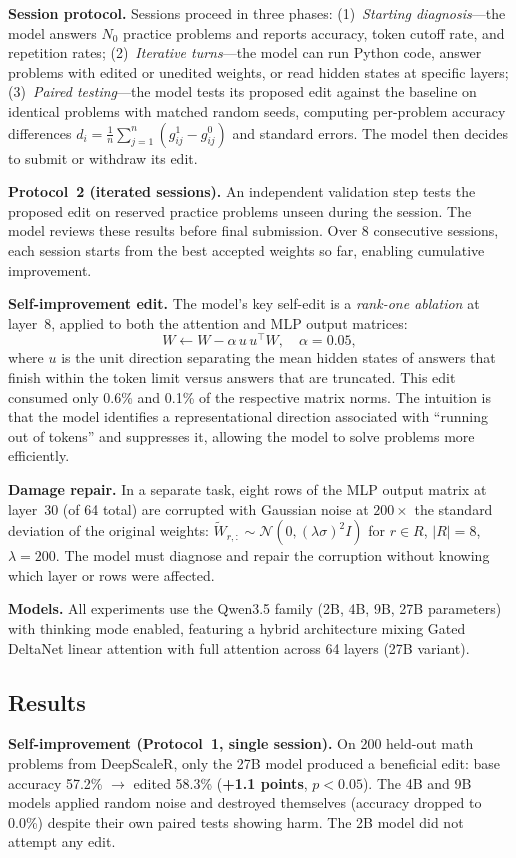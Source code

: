 \documentclass[11pt,a4paper]{article}
\begin{document}
\textbf{Session protocol.} Sessions proceed in three phases: (1)~\emph{Starting diagnosis}---the model answers $N_0$ practice problems and reports accuracy, token cutoff rate, and repetition rates; (2)~\emph{Iterative turns}---the model can run Python code, answer problems with edited or unedited weights, or read hidden states at specific layers; (3)~\emph{Paired testing}---the model tests its proposed edit against the baseline on identical problems with matched random seeds, computing per-problem accuracy differences $d_i = \frac{1}{n}\sum_{j=1}^{n}(g_{ij}^1 - g_{ij}^0)$ and standard errors. The model then decides to submit or withdraw its edit.

\textbf{Protocol~2 (iterated sessions).} An independent validation step tests the proposed edit on reserved practice problems unseen during the session. The model reviews these results before final submission. Over 8 consecutive sessions, each session starts from the best accepted weights so far, enabling cumulative improvement.

\textbf{Self-improvement edit.} The model's key self-edit is a \emph{rank-one ablation} at layer~8, applied to both the attention and MLP output matrices:
\[
  W \leftarrow W - \alpha\, u\, u^\top W, \quad \alpha = 0.05,
\]
where $u$ is the unit direction separating the mean hidden states of answers that finish within the token limit versus answers that are truncated. This edit consumed only 0.6\% and 0.1\% of the respective matrix norms. The intuition is that the model identifies a representational direction associated with ``running out of tokens'' and suppresses it, allowing the model to solve problems more efficiently.

\textbf{Damage repair.} In a separate task, eight rows of the MLP output matrix at layer~30 (of 64 total) are corrupted with Gaussian noise at $200\times$ the standard deviation of the original weights: $\tilde{W}_{r,:} \sim \mathcal{N}(0, (\lambda\sigma)^2 I)$ for $r \in R$, $|R|{=}8$, $\lambda{=}200$. The model must diagnose and repair the corruption without knowing which layer or rows were affected.

\textbf{Models.} All experiments use the Qwen3.5 family (2B, 4B, 9B, 27B parameters) with thinking mode enabled, featuring a hybrid architecture mixing Gated DeltaNet linear attention with full attention across 64 layers (27B variant).

\subsection{Results}
\textbf{Self-improvement (Protocol~1, single session).} On 200 held-out math problems from DeepScaleR, only the 27B model produced a beneficial edit: base accuracy 57.2\% $\rightarrow$ edited 58.3\% (\textbf{+1.1 points}, $p < 0.05$). The 4B and 9B models applied random noise and destroyed themselves (accuracy dropped to 0.0\%) despite their own paired tests showing harm. The 2B model did not attempt any edit.
\end{document}
